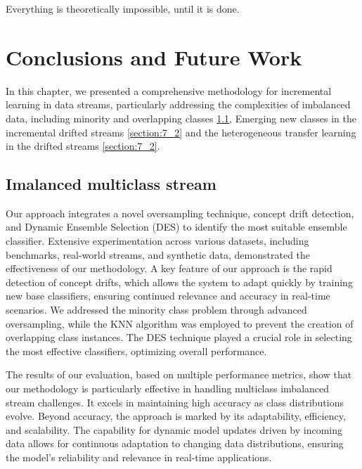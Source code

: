


\begin{savequote}[50mm]
Everything is theoretically impossible, until it is done.
\end{savequote}

\chapter{Conclusions and Future Work}
\label{chapter:7_Conclusions}
In this chapter, we presented a comprehensive methodology for incremental learning in data streams, particularly addressing the complexities of imbalanced data, including minority and overlapping classes \ref{section:7_1}, Emerging new classes in the incremental drifted streams \ref{section:7_2} and the heterogeneous transfer learning in the drifted streams \ref{section:7_2}.

\section{Imalanced multiclass stream}
\label{section:7_1}
Our approach integrates a novel oversampling technique, concept drift detection, and Dynamic Ensemble Selection (DES) to identify the most suitable ensemble classifier. Extensive experimentation across various datasets, including benchmarks, real-world streams, and synthetic data, demonstrated the effectiveness of our methodology.
A key feature of our approach is the rapid detection of concept drifts, which allows the system to adapt quickly by training new base classifiers, ensuring continued relevance and accuracy in real-time scenarios. We addressed the minority class problem through advanced oversampling, while the KNN algorithm was employed to prevent the creation of overlapping class instances. The DES technique played a crucial role in selecting the most effective classifiers, optimizing overall performance.

The results of our evaluation, based on multiple performance metrics, show that our methodology is particularly effective in handling multiclass imbalanced stream challenges. It excels in maintaining high accuracy as class distributions evolve. Beyond accuracy, the approach is marked by its adaptability, efficiency, and scalability. The capability for dynamic model updates driven by incoming data allows for continuous adaptation to changing data distributions, ensuring the model's reliability and relevance in real-time applications.

